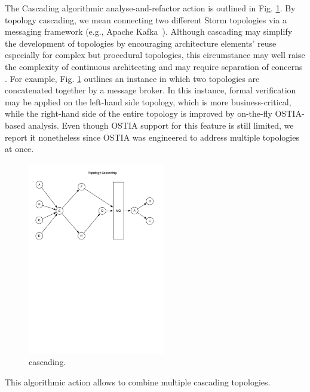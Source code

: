 The Cascading algorithmic analyse-and-refactor action is outlined in Fig. \ref{fig:cascading}. By topology cascading, we mean connecting two different Storm topologies via a messaging framework (e.g., Apache Kafka~\cite{kafka}).
Although cascading may simplify the development of topologies by encouraging architecture elements' reuse especially for complex but procedural topologies, this circumstance may well raise the complexity of continuous architecting and may require separation of concerns \cite{soc}. For example, Fig. \ref{fig:cascading} outlines an instance in which two topologies are concatenated together by a message broker. In this instance, formal verification may be applied on the left-hand side topology, which is more business-critical, while the right-hand side of the entire topology is improved by on-the-fly OSTIA-based analysis. Even though OSTIA support for this feature is still limited, we report it nonetheless since OSTIA was engineered to address multiple topologies at once. 

\begin{figure}
	\begin{center}
		\includegraphics[width=6cm]{images/cascading}
		\caption{cascading.}
		\label{fig:cascading}
	\end{center}
\end{figure}

This algorithmic action allows to combine multiple cascading topologies.

